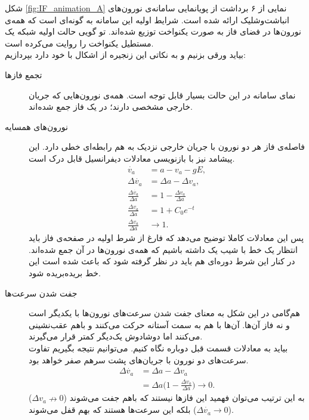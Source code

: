 شکل
\ref{fig:IF_animation_A}
نمایی از ۶ برداشت از پویانمایی سامانه‌ی نورون‌های انباشت‌وشلیک ارائه شده است. شرایط اولیه این سامانه به گونه‌ای است که همه‌ی نورون‌ها در فضای فاز به صورت یکنواخت توزیع شده‌اند. تو گویی حالت اولیه شبکه یک مستطیل یکنواخت را روایت می‌کرده است.\\
بیاید ورقی بزنیم و به نکاتی این زنجیره از اشکال با خود دارد بپردازیم:
\begin{description}
	\item[تجمع فازها] 
	نمای سامانه در این حالت بسیار قابل توجه است. همه‌ی نورون‌هایی که جریان خارجی مشخصی دارند؛ در یک فاز جمع شده‌اند.
	\item[نورون‌های همسایه] 
	 فاصله‌ی فاز هر دو نورون با جریان خارجی نزدیک به هم رابطه‌ای خطی دارد. این پیشامد نیز با بازنویسی معادلات دیفرانسیل قابل درک است.
	 \begin{align}
	 	\dot{v_a} &= a - v_a - g E ,\\
	 	\Delta\dot{v_a} &= \Delta a - \Delta v_a ,\\
	 	\frac{\Delta\dot{v_a}}{\Delta a} &= 1 - \frac{\Delta v_a}{\Delta a}\\
		\frac{\Delta v_a}{\Delta a} &= 1 + C_0 e^{-t}\\
		\frac{\Delta v_a}{\Delta a} &\rightarrow 1 .
	 \end{align}
 پس این معادلات کاملا توضیح می‌دهد که فارغ از شرط اولیه در صفحه‌ی فاز باید انتظار یک خط با شیب یک داشته باشیم که همه‌ی نورون‌ها در آن جمع شده‌اند. در کنار این شرط دوره‌ای هم باید در نظر گرفته شود که باعث شده است این خط بریده‌بریده شود.
 	\item[جفت شدن سرعت‌ها]
 	هم‌گامی در این شکل به معنای جفت شدن سرعت‌های نورون‌ها با یکدیگر است و نه فاز آن‌ها. آن‌ها با هم به سمت آستانه حرکت می‌کنند و باهم عقب‌نشینی می‌کنند اما دوشادوش یک‌دیگر کمتر قرار می‌گیرند.\\
 	بیاید به معادلات قسمت قبل دوباره نگاه کنیم. می‌توانیم نتیجه بگیریم تفاوت سرعت‌های دو نورون با جریان‌های پشت سرهم صفر خواهد بود.
 	\begin{align}
 		\Delta\dot{v_a} &= \Delta a - \Delta v_a\\
 		&= \Delta a \big(1 - \frac{\Delta v_a}{\Delta a} \big) \rightarrow 0 .
 	\end{align}
 	به این ترتیب می‌توان فهمید این فازها نیستند که باهم جفت می‌شوند 
 	($\Delta v_a \nrightarrow 0 $)
 	بلکه این سرعت‌ها هستند که بهم قفل می‌شوند
 	($\Delta \dot{v_a} \rightarrow 0 $).
\end{description}

